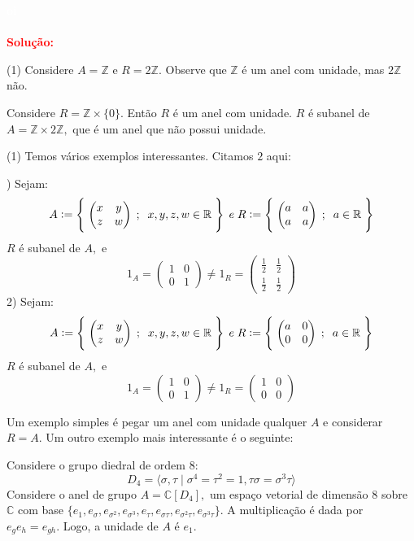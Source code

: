 \documentclass[11pt,a4paper]{article}
\newcommand{\dividiritens}[1]{\begin{tasks}[counter-format={(tsk[a])},label-width=3.6ex, label-format = {\bfseries}, column-sep = {0pt}](1) #1 \end{tasks}}
\newcommand{\pers}[1]{\textcolor{Floresta}{$\negrito{(#1)} $}}
\newcommand{\solucao}[1]{
\textbf{\textcolor{white}{oi}\\ \\ \textcolor{red}{Solução:}} #1}
\begin{document}
\solucao{
\dividiritens{
\task[\pers{a}] Considere $A = \mathbb{Z}$ e $R = 2 \mathbb{Z}.$ Observe que $ \mathbb{Z}$ é um anel com unidade, mas $2 \mathbb{Z}$ não.

\task[\pers{b}] Considere $R = \mathbb{Z} \times \{ 0 \}.$ Então $R$ é um anel com unidade. $R$ é subanel de $A = \mathbb{Z} \times 2 \mathbb{Z},$ que é um anel que não possui unidade.
}
\dividiritens{
\task[\pers{c}] Temos vários exemplos interessantes. Citamos $2$ aqui:

\medskip
\noindent
1) Sejam:
\[
A:=\left\{\;\begin{pmatrix}x&y\\z&w\end{pmatrix}\;;\;\;x,y,z,w\in\Bbb R\;\right\}\; e \;R:=\left\{\;\begin{pmatrix}a&a\\a&a\end{pmatrix}\;;\;\;a\in\Bbb R\;\right\}
\]
$R$ é subanel de $A,$ e 
\[
1_A = \begin{pmatrix}1&0\\0&1\end{pmatrix} \neq 1_R = \begin{pmatrix}\frac{1}{2}&\frac{1}{2}\\\frac{1}{2}&\frac{1}{2}\end{pmatrix}
\]
2) Sejam:
\[
A:=\left\{\;\begin{pmatrix}x&y\\z&w\end{pmatrix}\;;\;\;x,y,z,w\in\Bbb R\;\right\}\; e \;R:=\left\{\;\begin{pmatrix}a&0\\0&0\end{pmatrix}\;;\;\;a\in\Bbb R\;\right\}
\]
$R$ é subanel de $A,$ e 
\[
1_A = \begin{pmatrix}1&0\\0&1\end{pmatrix} \neq 1_R = \begin{pmatrix}1&0\\0&0\end{pmatrix}
\]

\task[\pers{d}]
Um exemplo simples é pegar um anel com unidade qualquer $A$ e considerar $R=A$. Um outro exemplo mais interessante é o seguinte:

\medskip
\noindent
Considere o grupo diedral de ordem $8:$
\[
D_4 = \langle \sigma, \tau \mid \sigma^4 = \tau^2 = 1, \tau \sigma = \sigma^3 \tau \rangle
\]
Considere o anel de grupo $A = \mathbb{C}[D_4],$ um espaço vetorial de dimensão $8$ sobre $\mathbb{C}$ com base $\{e_{1}, e_{\sigma}, e_{\sigma^2}, e_{\sigma^3}, e_{\tau}, e_{\sigma \tau}, e_{\sigma^2\tau}, e_{\sigma^3 \tau} \}.$ A multiplicação é dada por $e_ge_h = e_{gh}.$ Logo, a unidade de $A$ é $e_{1}.$
}

}
\end{document}
